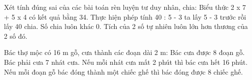 \begin{ex} %
Xét tính đúng sai của các bài toán rèn luyện tư duy nhân, chia:
\choiceTF
{\True Biểu thức 2 x 7 + 5 x 4 có kết quả bằng 34.}
{Thực hiện phép tính 40 : 5 - 3 ta lấy 5 - 3 trước rồi lấy 40 chia.}
{\True Số chia luôn khác 0.}
{Tích của 2 số tự nhiên luôn lớn hơn thương của 2 số đó.}
\end{ex}

\begin{ex} %
Bác thợ mộc có 16 m gỗ, cưa thành các đoạn dài 2 m:
\choiceTF
{\True Bác cưa được 8 đoạn gỗ.}
{\True Bác phải cưa 7 nhát cưa.}
{Nếu mỗi nhát cưa mất 2 phút thì bác cưa hết 16 phút.}
{\True Nếu mỗi đoạn gỗ bác đóng thành một chiếc ghế thì bác đóng được 8 chiếc ghế.}
\end{ex}

